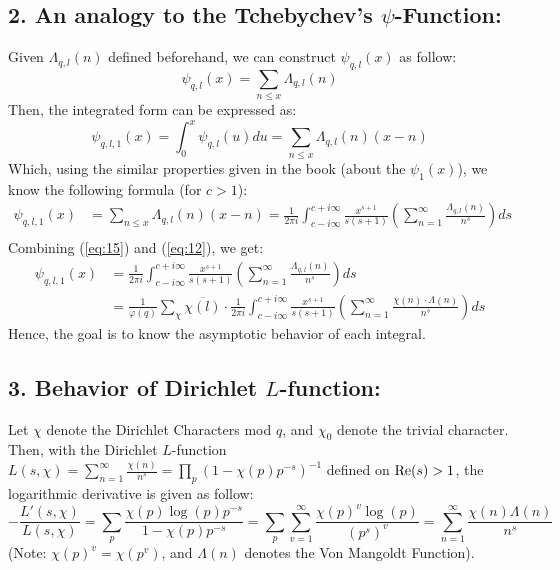 \documentclass{article}
\newcommand{\Real}{\textmd{Re}}
\begin{document}
\subsection*{2. An analogy to the Tchebychev's $\psi$-Function:}
Given $\Lambda_{q,l}(n)$ defined beforehand, we can construct $\psi_{q,l}(x)$ as follow:
\begin{equation}
    \label{eq:13}
    \psi_{q,l}(x) = \sum_{n\leq x}\Lambda_{q,l}(n)
\end{equation}
Then, the integrated form can be expressed as:
\begin{equation}
    \label{eq:14}
    \psi_{q,l,1}(x)=\int_{0}^{x}\psi_{q,l}(u)du = \sum_{n\leq x}\Lambda_{q,l}(n)(x-n)
\end{equation}
Which, using the similar properties given in the book (about the $\psi_1(x)$), we know the following formula (for $c>1$):
\begin{equation}
    \label{eq:15}
    \begin{split}
        \psi_{q,l,1}(x)&=\sum_{n\leq x}\Lambda_{q,l}(n)(x-n) = \frac{1}{2\pi i}\int_{c-i\infty}^{c+i\infty}\frac{x^{s+1}}{s(s+1)}\left(\sum_{n=1}^{\infty}\frac{\Lambda_{q,l}(n)}{n^s}\right)ds\\
    \end{split}
\end{equation}
Combining (\ref{eq:15}) and (\ref{eq:12}), we get:
\begin{equation}
    \label{eq:16}
    \begin{split}
        \psi_{q,l,1}(x)&=\frac{1}{2\pi i}\int_{c-i\infty}^{c+i\infty}\frac{x^{s+1}}{s(s+1)}\left(\sum_{n=1}^{\infty}\frac{\Lambda_{q,l}(n)}{n^s}\right)ds\\
        &=\frac{1}{\varphi(q)}\sum_{\chi}\overline{\chi(l)}\cdot\frac{1}{2\pi i}\int_{c-i\infty}^{c+i\infty}\frac{x^{s+1}}{s(s+1)}\left(\sum_{n=1}^{\infty}\frac{\chi(n)\cdot\Lambda(n)}{n^s}\right)ds
    \end{split}
\end{equation}
Hence, the goal is to know the asymptotic behavior of each integral.

\subsection*{3. Behavior of Dirichlet $L$-function:}
Let $\chi$ denote the Dirichlet Characters mod $q$, and $\chi_0$ denote the trivial character. Then, with the Dirichlet $L$-function $L(s,\chi)=\sum_{n=1}^{\infty}\frac{\chi(n)}{n^s} = \prod_{p}(1-\chi(p)p^{-s})^{-1}$ defined on $\Real(s)>1$, the logarithmic derivative is given as follow:
\begin{equation}
    \label{eq:17}
    -\frac{L'(s,\chi)}{L(s,\chi)} = \sum_{p}\frac{\chi(p)\log(p)p^{-s}}{1-\chi(p)p^{-s}} = \sum_{p}\sum_{v=1}^{\infty}\frac{\chi(p)^v\log(p)}{(p^s)^v} = \sum_{n=1}^{\infty}\frac{\chi(n)\Lambda(n)}{n^s}
\end{equation} 
(Note: $\chi(p)^v = \chi(p^v)$, and $\Lambda(n)$ denotes the Von Mangoldt Function).
\end{document}
